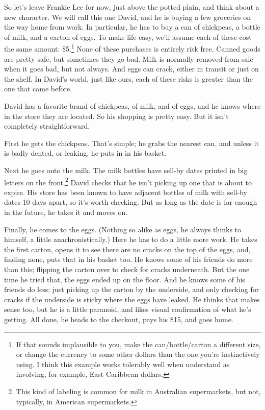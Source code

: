 \documentclass[
  10pt,
  letterpaper,
  twoside]{scrbook}
\begin{document}
So let's leave Frankie Lee for now, just above the potted plain, and
think about a new character. We will call this one David, and he is
buying a few groceries on the way home from work. In particular, he has
to buy a can of chickpeas, a bottle of milk, and a carton of eggs. To
make life easy, we'll assume each of these cost the same amount:
\$5.\footnote{If that sounds implausible to you, make the
  can/bottle/carton a different size, or change the currency to some
  other dollars than the one you're instinctively using. I think this
  example works tolerably well when understand as involving, for
  example, East Caribbean dollars.} None of these purchases is entirely
risk free. Canned goods are pretty safe, but sometimes they go bad. Milk
is normally removed from sale when it goes bad, but not always. And eggs
can crack, either in transit or just on the shelf. In David's world,
just like ours, each of these risks is greater than the one that came
before.

David has a favorite brand of chickpeas, of milk, and of eggs, and he
knows where in the store they are located. So his shopping is pretty
easy. But it isn't completely straightforward.

First he gets the chickpeas. That's simple; he grabs the nearest can,
and unless it is badly dented, or leaking, he puts in in his basket.

Next he goes onto the milk. The milk bottles have sell-by dates printed
in big letters on the front.\footnote{This kind of labeling is common
  for milk in Australian supermarkets, but not, typically, in American
  supermarkets.} David checks that he isn't picking up one that is about
to expire. His store has been known to have adjacent bottles of milk
with sell-by dates 10 days apart, so it's worth checking. But as long as
the date is far enough in the future, he takes it and moves on.

Finally, he comes to the eggs. (Nothing so alike as eggs, he always
thinks to himself, a little anachronistically.) Here he has to do a
little more work. He takes the first carton, opens it to see there are
no cracks on the top of the eggs, and, finding none, puts that in his
basket too. He knows some of his friends do more than this; flipping the
carton over to check for cracks underneath. But the one time he tried
that, the eggs ended up on the floor. And he knows some of his friends
do less; just picking up the carton by the underside, and only checking
for cracks if the underside is sticky where the eggs have leaked. He
thinks that makes sense too, but he is a little paranoid, and likes
visual confirmation of what he's getting. All done, he heads to the
checkout, pays his \$15, and goes home.
\end{document}
